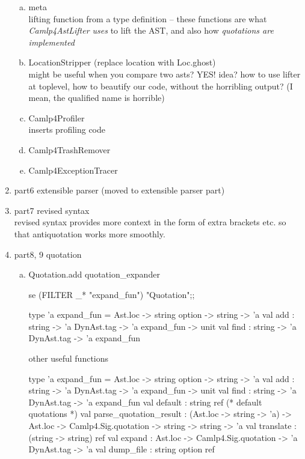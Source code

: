 \begin{enumerate}
\begin{enumerate}[(a)]
\item meta \\ 
  lifting function from a type definition -- these functions are what
  \emph{Camlp4AstLifter uses} to lift the AST, and also how
  \emph{quotations are implemented  }
\item LocationStripper (replace location with Loc.ghost) \\
  might be useful when you compare two asts? YES!
  idea? how to use lifter at toplevel, how to beautify our code,
  without the horribling output? (I mean, the qualified name is horrible)
\item Camlp4Profiler \\
  inserts profiling code
\item Camlp4TrashRemover \\
\item Camlp4ExceptionTracer 
\end{enumerate}

\item part6 extensible parser (moved to extensible parser part)

\item part7 revised syntax \\
  revised syntax provides more context in the form of extra brackets
  etc. so that antiquotation works more smoothly.
\item part8, 9 quotation
  \begin{enumerate}[(a)]
  \item Quotation.add  quotation\_expander 

\begin{redcode}
se (FILTER _* "expand_fun") "Quotation";;
\end{redcode}

\begin{bluecode}
type 'a expand_fun = Ast.loc -> string option -> string -> 'a
val add : string -> 'a DynAst.tag -> 'a expand_fun -> unit
val find : string -> 'a DynAst.tag -> 'a expand_fun      
\end{bluecode}

other useful functions 
  \begin{bluecode}
type 'a expand_fun = Ast.loc -> string option -> string -> 'a
val add : string -> 'a DynAst.tag -> 'a expand_fun -> unit
val find : string -> 'a DynAst.tag -> 'a expand_fun
val default : string ref  (* default quotations *)
val parse_quotation_result :
      (Ast.loc -> string -> 'a) ->
      Ast.loc -> Camlp4.Sig.quotation -> string -> string -> 'a
val translate : (string -> string) ref
val expand : Ast.loc -> Camlp4.Sig.quotation -> 'a DynAst.tag -> 'a
val dump_file : string option ref
\end{bluecode}


\end{enumerate}
\end{enumerate}
